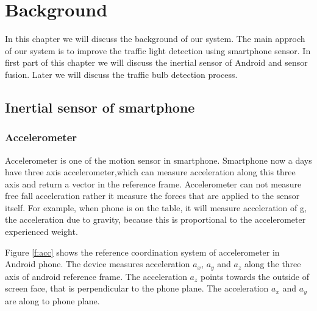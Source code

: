 \chapter{Background}
\label{c:background}
In this chapter we will discuss the background of our system.
The main approch of our system is to improve the traffic light detection using smartphone sensor.
In first part of this chapter we will discuss the inertial sensor of Android and sensor fusion.
Later we will discuss the traffic bulb detection process.

\section{Inertial sensor of smartphone}
\subsection{Accelerometer}
Accelerometer is one of the motion sensor in smartphone.
Smartphone now a days have three axis accelerometer,which can measure acceleration along this three axis and return a vector in the reference frame.
Accelerometer can not measure free fall acceleration rather it measure the forces that are applied to the sensor itself.
For example, when phone is on the table, it will measure acceleration of g, the acceleration due to gravity, because this is proportional to the accelerometer experienced weight.

Figure \ref{f:acc} shows the reference coordination system of accelerometer in Android phone.
The device measures acceleration $a_x$, $a_y$ and $a_z$ along the three axis of android reference frame.
The acceleration $a_z$ points towards the outside of screen face, that is perpendicular to the phone plane.
The acceleration $a_x$ and $a_y$ are along to phone plane.


